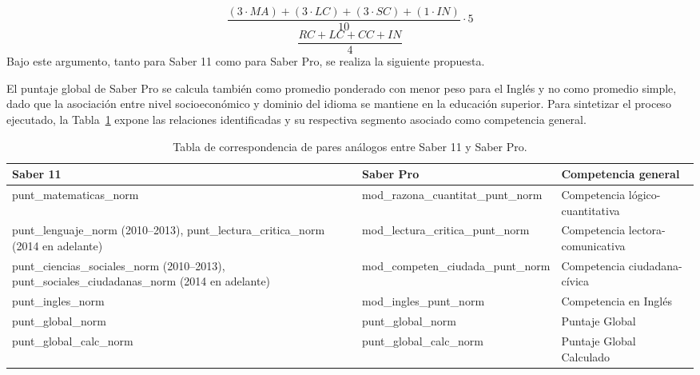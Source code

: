 \begin{equation}
\frac{(3 \cdot MA) + (3 \cdot LC) + (3 \cdot SC) + (1 \cdot IN)}{10} \cdot 5
\label{eq:global_saber11_propio}
\end{equation}
\begin{equation}
\frac{RC + LC + CC + IN}{4}
\label{eq:global_saberpro_propio}
\end{equation}
Bajo este argumento, tanto para Saber 11 como para  Saber Pro, se realiza la siguiente propuesta.

El puntaje global de Saber Pro se calcula también como promedio ponderado con menor peso para el Inglés y no como promedio simple, dado que la asociación entre nivel socioeconómico y dominio del idioma se mantiene en la educación superior. Para sintetizar el proceso ejecutado, la Tabla~\ref{tab:correspondencia} expone las relaciones identificadas y su respectiva segmento asociado como competencia general.

\begin{table}[!ht]
	\centering
	\begin{adjustbox}{max width=\textwidth}
		\footnotesize
		\begin{tabularx}{\textwidth}{|>{\raggedright\arraybackslash}X|
				>{\raggedright\arraybackslash}X|
				>{\raggedright\arraybackslash}X|}
			\hline
			\textbf{Saber 11} &
			\textbf{Saber Pro} &
			\textbf{Competencia general} \\ \hline
			
			punt\_matematicas\_norm &
			mod\_razona\_cuantitat\_punt\_norm &
			Competencia lógico-cuantitativa \\ \hline
			
			punt\_lenguaje\_norm (2010--2013), punt\_lectura\_critica\_norm (2014 en adelante) &
			mod\_lectura\_critica\_punt\_norm &
			Competencia lectora-comunicativa \\ \hline
			
			punt\_ciencias\_sociales\_norm (2010--2013), punt\_sociales\_ciudadanas\_norm (2014 en adelante) &
			mod\_competen\_ciudada\_punt\_norm &
			Competencia ciudadana-cívica \\ \hline
			
			punt\_ingles\_norm &
			mod\_ingles\_punt\_norm &
			Competencia en Inglés \\ \hline
			
			punt\_global\_norm &
			punt\_global\_norm &
			Puntaje Global \\ \hline
			
			punt\_global\_calc\_norm &
			punt\_global\_calc\_norm &
			Puntaje Global Calculado \\ \hline
			
		\end{tabularx}
	\end{adjustbox}
	\caption{Tabla de correspondencia de pares análogos entre Saber 11 y Saber Pro.}
	\label{tab:correspondencia}
\end{table}

